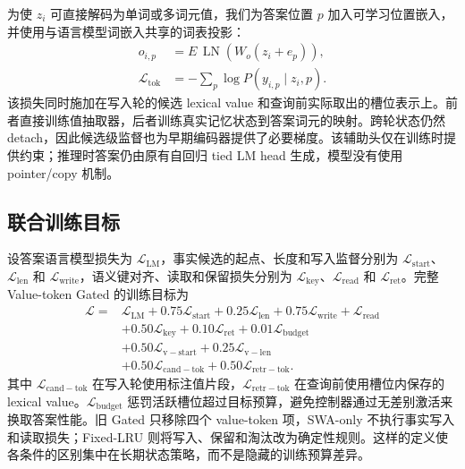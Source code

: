 \documentclass[letterpaper]{article}
\begin{document}
为使 $z_i$ 可直接解码为单词或多词元值，我们为答案位置 $p$ 加入可学习位置嵌入，并使用与语言模型词嵌入共享的词表投影：
\begin{equation}
\begin{split}
o_{i,p}&=E\,\operatorname{LN}
\left(W_o(z_i+e_p)\right),\\
\mathcal{L}_{\mathrm{tok}}&=
 -\sum_p\log P(y_{i,p}\mid z_i,p).
\end{split}
\end{equation}
该损失同时施加在写入轮的候选 lexical value 和查询前实际取出的槽位表示上。前者直接训练值抽取器，后者训练真实记忆状态到答案词元的映射。跨轮状态仍然 detach，因此候选级监督也为早期编码器提供了必要梯度。该辅助头仅在训练时提供约束；推理时答案仍由原有自回归 tied LM head 生成，模型没有使用 pointer/copy 机制。

\subsection{联合训练目标}

设答案语言模型损失为 $\mathcal{L}_{\mathrm{LM}}$，事实候选的起点、长度和写入监督分别为 $\mathcal{L}_{\mathrm{start}}$、$\mathcal{L}_{\mathrm{len}}$ 和 $\mathcal{L}_{\mathrm{write}}$，语义键对齐、读取和保留损失分别为 $\mathcal{L}_{\mathrm{key}}$、$\mathcal{L}_{\mathrm{read}}$ 和 $\mathcal{L}_{\mathrm{ret}}$。完整 Value-token Gated 的训练目标为
\begin{equation}
\begin{split}
\mathcal{L}={}&\mathcal{L}_{\mathrm{LM}}
+0.75\mathcal{L}_{\mathrm{start}}+0.25\mathcal{L}_{\mathrm{len}}
+0.75\mathcal{L}_{\mathrm{write}}+\mathcal{L}_{\mathrm{read}}\\
&+0.50\mathcal{L}_{\mathrm{key}}+0.10\mathcal{L}_{\mathrm{ret}}
+0.01\mathcal{L}_{\mathrm{budget}}\\
&+0.50\mathcal{L}_{\mathrm{v-start}}+0.25\mathcal{L}_{\mathrm{v-len}}\\
&+0.50\mathcal{L}_{\mathrm{cand-tok}}+0.50\mathcal{L}_{\mathrm{retr-tok}}.
\end{split}
\end{equation}
其中 $\mathcal{L}_{\mathrm{cand-tok}}$ 在写入轮使用标注值片段，$\mathcal{L}_{\mathrm{retr-tok}}$ 在查询前使用槽位内保存的 lexical value。$\mathcal{L}_{\mathrm{budget}}$ 惩罚活跃槽位超过目标预算，避免控制器通过无差别激活来换取答案性能。旧 Gated 只移除四个 value-token 项，SWA-only 不执行事实写入和读取损失；Fixed-LRU 则将写入、保留和淘汰改为确定性规则。这样的定义使各条件的区别集中在长期状态策略，而不是隐藏的训练预算差异。
\end{document}
